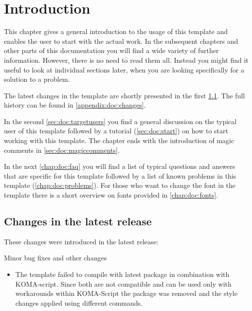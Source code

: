 \chapter{Introduction}

This chapter gives a general introduction to the usage of this template and enables the user to start with the actual work. 
In the subsequent chapters and other parts of this documentation you will find a wide variety of further information. However, there is no need to read them all. Instead you might find it useful to look at individual sections later, when you are looking specifically for a solution to a problem.

The latest changes in the template are shortly presented in the first \cref{sec:doc:changes}. The full history can be found in \cref{appendix:doc:changes}.

In the second \cref{sec:doc:targetusers} you find a general discussion on the typical user of this template followed by a tutorial (\cref{sec:doc:start}) on how to start working with this template. The chapter ends with the introduction of magic comments in \cref{sec:doc:magiccomments}.

In the next \cref{chap:doc:faq} you will find a list of typical questions and answers that are specific for this template followed by a list of known problems in this template (\cref{chap:doc:problems}). For those who want to change the font in the template there is a short overview on fonts provided in \cref{chap:doc:fonts}.
\section{Changes in the latest release}
\label{sec:doc:changes}

These changes were introduced in the latest release:

Minor bug fixes and other changes
\begin{itemize}
\item The template failed to compile with latest package  in combination with KOMA-script. Since both are not compatible and can be used only with workarounds within KOMA-Script the package  was removed and the style changes applied using different commands.
\end{itemize}

